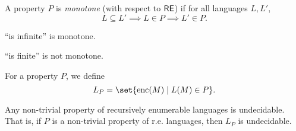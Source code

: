 \begin{definition}[Monotonicity] \label{def:monotonicity}
    A property $P$ is \emph{monotone} (with respect to $\mathsf{RE}$) if for all
    languages $L, L'$, \[
        L \subseteq L' \implies L \in P \implies L' \in P.
    \]
\end{definition}
\begin{examples}
    \item ``is infinite'' is monotone.
    \item ``is finite'' is not monotone.
\end{examples}

\begin{definition}
    For a property $P$, we define \[
        L_P = \set{\enc(M) \mid L(M) \in P}.
    \]
\end{definition}
\begin{theorem*}[Rice 1953] \label{thm:rice}
    Any non-trivial property of recursively enumerable languages is
    undecidable.
    That is, if $P$ is a non-trivial property of r.e. languages, then
    $L_P$ is undecidable.
\end{theorem*}
